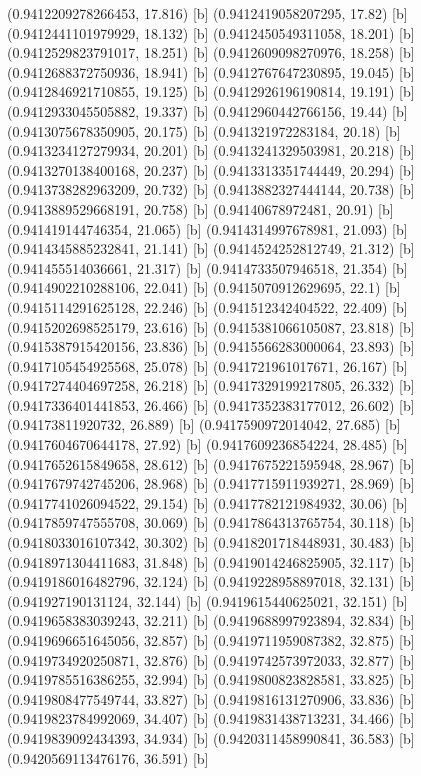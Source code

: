 {{{(0.9412209278266453, 17.816) [b] 
(0.9412419058207295, 17.82) [b] 
(0.9412441101979929, 18.132) [b] 
(0.9412450549311058, 18.201) [b] 
(0.9412529823791017, 18.251) [b] 
(0.9412609098270976, 18.258) [b] 
(0.9412688372750936, 18.941) [b] 
(0.9412767647230895, 19.045) [b] 
(0.9412846921710855, 19.125) [b] 
(0.9412926196190814, 19.191) [b] 
(0.9412933045505882, 19.337) [b] 
(0.9412960442766156, 19.44) [b] 
(0.9413075678350905, 20.175) [b] 
(0.941321972283184, 20.18) [b] 
(0.9413234127279934, 20.201) [b] 
(0.9413241329503981, 20.218) [b] 
(0.9413270138400168, 20.237) [b] 
(0.9413313351744449, 20.294) [b] 
(0.9413738282963209, 20.732) [b] 
(0.9413882327444144, 20.738) [b] 
(0.9413889529668191, 20.758) [b] 
(0.94140678972481, 20.91) [b] 
(0.941419144746354, 21.065) [b] 
(0.9414314997678981, 21.093) [b] 
(0.9414345885232841, 21.141) [b] 
(0.9414524252812749, 21.312) [b] 
(0.941455514036661, 21.317) [b] 
(0.9414733507946518, 21.354) [b] 
(0.9414902210288106, 22.041) [b] 
(0.9415070912629695, 22.1) [b] 
(0.9415114291625128, 22.246) [b] 
(0.941512342404522, 22.409) [b] 
(0.9415202698525179, 23.616) [b] 
(0.9415381066105087, 23.818) [b] 
(0.9415387915420156, 23.836) [b] 
(0.9415566283000064, 23.893) [b] 
(0.9417105454925568, 25.078) [b] 
(0.941721961017671, 26.167) [b] 
(0.9417274404697258, 26.218) [b] 
(0.9417329199217805, 26.332) [b] 
(0.9417336401441853, 26.466) [b] 
(0.9417352383177012, 26.602) [b] 
(0.94173811920732, 26.889) [b] 
(0.9417590972014042, 27.685) [b] 
(0.9417604670644178, 27.92) [b] 
(0.9417609236854224, 28.485) [b] 
(0.9417652615849658, 28.612) [b] 
(0.9417675221595948, 28.967) [b] 
(0.9417679742745206, 28.968) [b] 
(0.9417715911939271, 28.969) [b] 
(0.9417741026094522, 29.154) [b] 
(0.9417782121984932, 30.06) [b] 
(0.9417859747555708, 30.069) [b] 
(0.9417864313765754, 30.118) [b] 
(0.9418033016107342, 30.302) [b] 
(0.9418201718448931, 30.483) [b] 
(0.9418971304411683, 31.848) [b] 
(0.9419014246825905, 32.117) [b] 
(0.9419186016482796, 32.124) [b] 
(0.9419228958897018, 32.131) [b] 
(0.941927190131124, 32.144) [b] 
(0.9419615440625021, 32.151) [b] 
(0.9419658383039243, 32.211) [b] 
(0.9419688997923894, 32.834) [b] 
(0.9419696651645056, 32.857) [b] 
(0.9419711959087382, 32.875) [b] 
(0.9419734920250871, 32.876) [b] 
(0.9419742573972033, 32.877) [b] 
(0.9419785516386255, 32.994) [b] 
(0.9419800823828581, 33.825) [b] 
(0.9419808477549744, 33.827) [b] 
(0.9419816131270906, 33.836) [b] 
(0.9419823784992069, 34.407) [b] 
(0.9419831438713231, 34.466) [b] 
(0.9419839092434393, 34.934) [b] 
(0.9420311458990841, 36.583) [b] 
(0.9420569113476176, 36.591) [b] 
}}}
